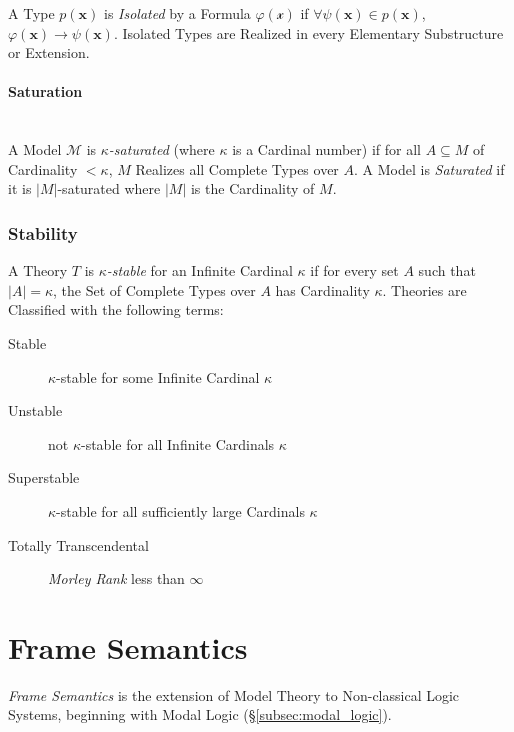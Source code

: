 A Type $p(\mathbf{x})$ is \emph{Isolated} by a Formula
$\varphi(\mathcal{x})$ if $\forall \psi(\mathbf{x}) \in
p(\mathbf{x})$, $\varphi (\mathbf{x}) \rightarrow
\psi(\mathbf{x})$. Isolated Types are Realized in every Elementary
Substructure or Extension.

\paragraph{Saturation}\label{subsec:model_saturation}\hfill
\\

A Model $\mathcal{M}$ is \emph{$\kappa$-saturated} (where $\kappa$ is
a Cardinal number) if for all $A \subseteq M$ of Cardinality $<
\kappa$, $M$ Realizes all Complete Types over $A$. A Model is
\emph{Saturated} if it is $|M|$-saturated where $|M|$ is the
Cardinality of $M$.

\subsubsection{Stability}\label{subsec:model_stability}

A Theory $T$ is \emph{$\kappa$-stable} for an Infinite Cardinal $\kappa$
if for every set $A$ such that $|A| = \kappa$, the Set of Complete
Types over $A$ has Cardinality $\kappa$. Theories are Classified with
the following terms:
\begin{description}
\item [Stable] $\kappa$-stable for some Infinite Cardinal $\kappa$
\item [Unstable] not $\kappa$-stable for all Infinite Cardinals $\kappa$
\item [Superstable] $\kappa$-stable for all sufficiently large
  Cardinals $\kappa$
\item [Totally Transcendental] \emph{Morley Rank}\cite{morley65} less
  than $\infty$
\end{description}



\section{Frame Semantics}\label{sec:frame_semantics}

\emph{Frame Semantics} is the extension of Model Theory to
Non-classical Logic Systems, beginning with Modal Logic
(\S\ref{subsec:modal_logic}).

